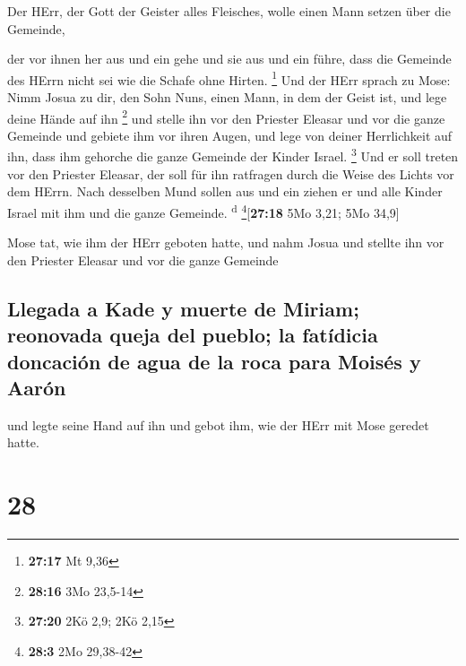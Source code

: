  Der HErr, der Gott der Geister alles Fleisches, wolle
einen Mann setzen über die Gemeinde,

 der vor ihnen her aus und ein gehe und sie aus und ein
führe, dass die Gemeinde des HErrn nicht sei wie die Schafe ohne Hirten.
\footnote{\textbf{27:17} Mt 9,36}  Und der HErr sprach zu
Mose: Nimm Josua zu dir, den Sohn Nuns, einen Mann, in dem der Geist
ist, und lege deine Hände auf ihn \footnote{\textbf{28:16} 3Mo 23,5-14}
 und stelle ihn vor den Priester Eleasar und vor die
ganze Gemeinde und gebiete ihm vor ihren Augen,  und lege
von deiner Herrlichkeit auf ihn, dass ihm gehorche die ganze Gemeinde
der Kinder Israel. \footnote{\textbf{27:20} 2Kö 2,9; 2Kö 2,15}
 Und er soll treten vor den Priester Eleasar, der soll
für ihn ratfragen durch die Weise des Lichts vor dem HErrn. Nach
desselben Mund sollen aus und ein ziehen er und alle Kinder Israel mit
ihm und die ganze Gemeinde. \textsuperscript{d}
\footnote{\textbf{28:3} 2Mo 29,38-42}{[}\textbf{27:18} 5Mo 3,21; 5Mo
34,9{]}

 Mose tat, wie ihm der HErr geboten hatte, und nahm Josua
und stellte ihn vor den Priester Eleasar und vor die ganze Gemeinde

\hypertarget{llegada-a-kade-y-muerte-de-miriam-reonovada-queja-del-pueblo-la-fatuxeddicia-doncaciuxf3n-de-agua-de-la-roca-para-moisuxe9s-y-aaruxf3n}{%
\subsection{Llegada a Kade y muerte de Miriam; reonovada queja del
pueblo; la fatídicia doncación de agua de la roca para Moisés y
Aarón}\label{llegada-a-kade-y-muerte-de-miriam-reonovada-queja-del-pueblo-la-fatuxeddicia-doncaciuxf3n-de-agua-de-la-roca-para-moisuxe9s-y-aaruxf3n}}

 und legte seine Hand auf ihn und gebot ihm, wie der HErr
mit Mose geredet hatte.

\hypertarget{section-27}{%
\section{28}\label{section-27}}

